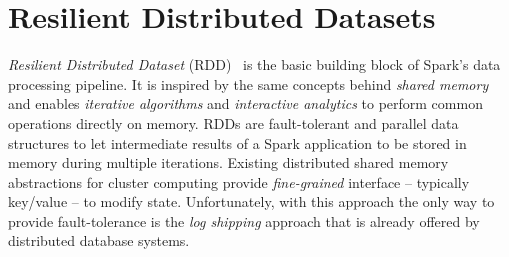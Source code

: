 
\section{Resilient Distributed Datasets}
\label{sp:rdd}
\emph{Resilient Distributed Dataset} (RDD)~\cite{Zaharia:2012} is the basic building block of Spark's data processing pipeline. It is inspired by the same concepts behind \emph{shared memory} and enables \emph{iterative algorithms} and \emph{interactive analytics} to perform common operations directly on memory. RDDs are fault-tolerant and parallel data structures to let intermediate results of a Spark application to be stored in memory during multiple iterations. Existing distributed shared memory abstractions for cluster computing provide \emph{fine-grained} interface -- typically key/value -- to modify state. Unfortunately, with this approach the only way to provide fault-tolerance is the \emph{log shipping} approach that is already offered by distributed database systems.

